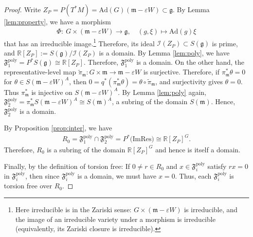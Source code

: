 \documentclass[11pt]{amsart}
\theoremstyle{definition}
\theoremstyle{plain}
\theoremstyle{conclusion}
\begin{document}
\begin{proof}
Write $Z_P =P(T^*M) = \mathrm{Ad}(G)(\mathfrak{m}-\varepsilon W) \subset \mathfrak{g}$. By Lemma \ref{lem:property}, we have a morphism \begin{align*}
\Phi :\ G \times(\mathfrak{m}-\varepsilon W) \longrightarrow \mathfrak{g},\quad (g,\xi)\longmapsto \mathrm{Ad}(g)\xi
\end{align*} that has an irreducible image.\footnote{Here irreducible is in the Zariski sense: $G\times(\mathfrak{m}-\varepsilon W)$ is irreducible, and the image of an irreducible variety under a morphism is irreducible (equivalently, its Zariski closure is irreducible).} Therefore, its ideal $\mathcal{I}(Z_P)\subset S(\mathfrak{g})$ is prime, and $\mathbb{R}[Z_P]:=S(\mathfrak{g})/\mathcal{I}(Z_P)$ is a domain. By Lemma \ref{lem:poly}, we have $\mathfrak{F}_1^{\mathrm{poly}}=P^*S(\mathfrak{g}) \cong \mathbb{R}[Z_P]$. Therefore, $\mathfrak{F}_1^{\mathrm{poly}}$ is a domain. On the other hand, the representative-level map $\widetilde{\pi}_{\mathfrak{m}}:G\times\mathfrak{m}\to\mathfrak{m}-\varepsilon W$ is surjective. Therefore, if $\pi_{\mathfrak{m}}^*\theta=0$ for $\theta\in S(\mathfrak{m}-\varepsilon W)^A$, then $0=q^*(\pi_{\mathfrak{m}}^*\theta)=\theta\circ\widetilde{\pi}_{\mathfrak{m}}$, and surjectivity gives $\theta=0$. Thus $\pi_{\mathfrak{m}}^*$ is injective on $S(\mathfrak{m}-\varepsilon W)^A$. By Lemma \ref{lem:poly} again, $\mathfrak{F}_2^{\mathrm{poly}}=\pi_{\mathfrak{m}}^*S(\mathfrak{m} -\varepsilon W)^A\cong S(\mathfrak{m})^A$, a subring of the domain $S(\mathfrak{m})$. Hence, $\mathfrak{F}_2^{\mathrm{poly}}$ is a domain.

By Proposition \ref{prop:inter}, we have \begin{align*}
R_0=\mathfrak{F}_1^{\mathrm{poly}}\cap\mathfrak{F}_2^{\mathrm{poly}} =P^* \big(\mathrm{Im}\mathrm{Res}\big) \cong \mathbb{R}[Z_P]^G.
\end{align*} Therefore, $R_0$ is a subring of the domain $\mathbb{R}[Z_P]^G$ and hence is itself a domain.

Finally, by the definition of torsion free: If $0\neq r\in R_0$ and $x\in \mathfrak{F}_i^{\mathrm{poly}}$ satisfy $rx=0$ in $\mathfrak{F}_i^{\mathrm{poly}}$, then since $\mathfrak{F}_i^{\mathrm{poly}}$ is a domain, we must have $x=0$. Thus, each $\mathfrak{F}_i^{\mathrm{poly}}$ is torsion free over $R_0$.
\end{proof}
\end{document}

